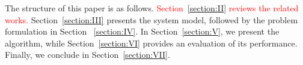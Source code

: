 \documentclass[10pt, journal,letterpaper]{IEEEtran}
\begin{document}
\begin{itemize}
	
	
	
	
	
\end{itemize}

The structure of this paper is as follows.  \textcolor{red}{Section~\ref{section:II} reviews the related works.} Section~\ref{section:III} presents the system model, followed by the problem formulation in Section ~\ref{section:IV}. In Section~\ref{section:V}, we present the algorithm, while Section~\ref{section:VI} provides an evaluation of its performance. Finally, we conclude in Section~\ref{section:VII}.
\end{document}
